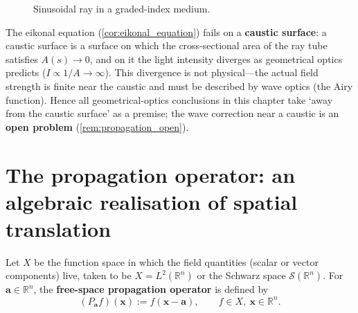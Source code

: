 \begin{figure}[htbp]
\centering
{}
\caption{Sinusoidal ray in a graded-index medium.}
\label{fig:graded_index_ray}
\end{figure}

\begin{remark}\label{rem:caustic_eikonal_failure}
The eikonal equation (\cref{cor:eikonal_equation}) fails on a \textbf{caustic surface}: a caustic surface is a surface on which the cross-sectional area of the ray tube satisfies $A(s)\to 0$, and on it the light intensity diverges as geometrical optics predicts ($I\propto 1/A\to\infty$). This divergence is not physical---the actual field strength is finite near the caustic and must be described by wave optics (the Airy function). Hence all geometrical-optics conclusions in this chapter take `away from the caustic surface' as a premise; the wave correction near a caustic is an \textbf{open problem} (\cref{rem:propagation_open}).
\end{remark}

\section{The propagation operator: an algebraic realisation of spatial translation}\label{sec:propagation_operator}

\begin{definition}\label{def:propagation_operator}
Let $X$ be the function space in which the field quantities (scalar or vector components) live, taken to be $X = L^2(\mathbb{R}^n)$ or the Schwarz space $\mathcal{S}(\mathbb{R}^n)$. For $\mathbf{a}\in\mathbb{R}^n$, the \textbf{free-space propagation operator} is defined by
\[
(P_{\mathbf{a}} f)(\mathbf{x}) := f(\mathbf{x}-\mathbf{a}), \qquad f\in X,\ \mathbf{x}\in\mathbb{R}^n.
\]
\end{definition}

